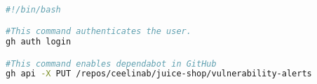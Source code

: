 \newpage
\label{EnableDependabot}



\begin{lstlisting}[language=bash, caption=Enable Dependabot, captionpos=b, frame=single]

#!/bin/bash

#This command authenticates the user.
gh auth login

#This command enables dependabot in GitHub
gh api -X PUT /repos/ceelinab/juice-shop/vulnerability-alerts
\end{lstlisting}